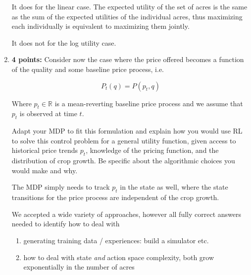 \documentclass[12pt]{exam}
\begin{document}
\begin{questions}
\begin{enumerate}
\begin{solution}
It does for the linear case. The expected utility of the set of acres is the same as the sum of the expected utilities of the individual acres, thus maximizing each individually is equivalent to maximizing them jointly.

It does not for the log utility case. 

\end{solution}


\item {\bf 4 points: } Consider now the case where the price offered becomes a function of the quality and some baseline price process,
i.e. 

\[P_t(q) = P(p_t, q)\]

Where $p_t \in \mathbb{R}$ is a mean-reverting baseline price process and we assume that $p_t$ is observed at time $t$.

Adapt your MDP to fit this formulation and explain how you would use RL to solve this control problem for a general utility function, given access to historical price trends $p_t$, knowledge of the pricing function, and the distribution of crop growth. Be specific about the algorithmic choices you would make and why.
 
\begin{solution}
The MDP simply needs to track $p_t$ in the state as well, where the state transitions for the price process are independent of the crop growth.

We accepted a wide variety of approaches, however all fully correct answers needed to identify how to deal with

\begin{enumerate}
    \item generating training data / experiences: build a simulator etc.
    \item how to deal with state {\em and } action space complexity, both grow exponentially in the number of acres
\end{enumerate}

\end{solution}


\end{enumerate}


\end{questions}
\end{document}
